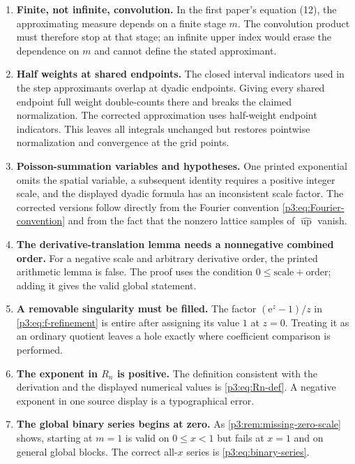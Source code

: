 \documentclass[11pt]{article}
\numberwithin{equation}{section}
\theoremstyle{definition}
\theoremstyle{remark}
\newcommand{\upf}{\operatorname{up}}
\newcommand{\e}{\mathrm e}
\begin{document}
\begin{enumerate}[label=\textbf{\arabic*.},leftmargin=*]
\item \textbf{Finite, not infinite, convolution.}
In the first paper's equation (12), the approximating measure depends on a
finite stage $m$.  The convolution product must therefore stop at that stage;
an infinite upper index would erase the dependence on $m$ and cannot define
the stated approximant.

\item \textbf{Half weights at shared endpoints.}
The closed interval indicators used in the step approximants overlap at
dyadic endpoints.  Giving every shared endpoint full weight double-counts
there and breaks the claimed normalization.  The corrected approximation
uses half-weight endpoint indicators.  This leaves all integrals unchanged
but restores pointwise normalization and convergence at the grid points.

\item \textbf{Poisson-summation variables and hypotheses.}
One printed exponential omits the spatial variable, a subsequent identity
requires a positive integer scale, and the displayed dyadic formula has an
inconsistent scale factor.  The corrected versions follow directly from the
Fourier convention \eqref{p3:eq:Fourier-convention} and from the fact that the
nonzero lattice samples of $\widehat{\upf}$ vanish.

\item \textbf{The derivative-translation lemma needs a nonnegative combined
order.}
For a negative scale and arbitrary derivative order, the printed arithmetic
lemma is false.  The proof uses the condition
$0\le \text{scale}+\text{order}$; adding it gives the valid global statement.

\item \textbf{A removable singularity must be filled.}
The factor $(\e^z-1)/z$ in \eqref{p3:eq:f-refinement} is entire after assigning
its value $1$ at $z=0$.  Treating it as an ordinary quotient leaves a hole
exactly where coefficient comparison is performed.

\item \textbf{The exponent in $R_n$ is positive.}
The definition consistent with the derivation and the displayed numerical
values is \eqref{p3:eq:Rn-def}.  A negative exponent in one source display is a
typographical error.

\item \textbf{The global binary series begins at zero.}
As \cref{p3:rem:missing-zero-scale} shows, starting at $m=1$ is valid on
$0\le x<1$ but fails at $x=1$ and on general global blocks.  The correct
all-$x$ series is \eqref{p3:eq:binary-series}.


\end{enumerate}
\end{document}
